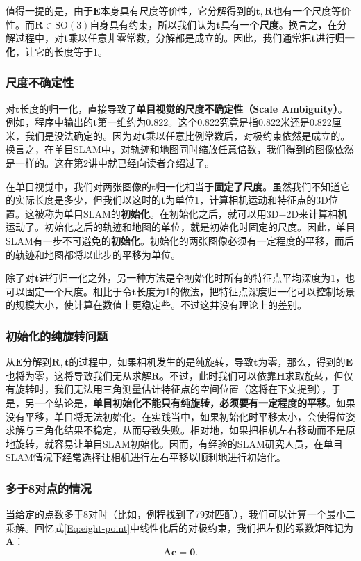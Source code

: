 值得一提的是，由于$\bm{E}$本身具有尺度等价性，它分解得到的$\bm{t}, \bm{R}$也有一个尺度等价性。而$\bm{R} \in \mathrm{SO}(3)$自身具有约束，所以我们认为$\bm{t}$具有一个\textbf{尺度}。换言之，在分解过程中，对$\bm{t}$乘以任意非零常数，分解都是成立的。因此，我们通常把$\bm{t}$进行\textbf{归一化}，让它的长度等于1。

\clearpage
\subsubsection{尺度不确定性}
对$\bm{t}$长度的归一化，直接导致了\textbf{单目视觉的尺度不确定性（Scale Ambiguity）}。例如，程序中输出的$\bm{t}$第一维约为0.822。这个0.822究竟是指0.822米还是0.822厘米，我们是没法确定的。因为对$\bm{t}$乘以任意比例常数后，对极约束依然是成立的。换言之，在单目SLAM中，对轨迹和地图同时缩放任意倍数，我们得到的图像依然是一样的。这在第2讲中就已经向读者介绍过了。

在单目视觉中，我们对两张图像的$\bm{t}$归一化相当于\textbf{固定了尺度}。虽然我们不知道它的实际长度是多少，但我们以这时的$\bm{t}$为单位1，计算相机运动和特征点的3D位置。这被称为单目SLAM的\textbf{初始化}。在初始化之后，就可以用3D−2D来计算相机运动了。初始化之后的轨迹和地图的单位，就是初始化时固定的尺度。因此，单目SLAM有一步不可避免的\textbf{初始化}。初始化的两张图像必须有一定程度的平移，而后的轨迹和地图都将以此步的平移为单位。

除了对$\bm{t}$进行归一化之外，另一种方法是令初始化时所有的特征点平均深度为1，也可以固定一个尺度。相比于令$\bm{t}$长度为1的做法，把特征点深度归一化可以控制场景的规模大小，使计算在数值上更稳定些。不过这并没有理论上的差别。

\subsubsection{初始化的纯旋转问题}
从$\bm{E}$分解到$\bm{R}, \bm{t}$的过程中，如果相机发生的是纯旋转，导致$\bm{t}$为零，那么，得到的$\bm{E}$也将为零，这将导致我们无从求解$\bm{R}$。不过，此时我们可以依靠$\bm{H}$求取旋转，但仅有旋转时，我们无法用三角测量估计特征点的空间位置（这将在下文提到），于是，另一个结论是，\textbf{单目初始化不能只有纯旋转，必须要有一定程度的平移}。如果没有平移，单目将无法初始化。在实践当中，如果初始化时平移太小，会使得位姿求解与三角化结果不稳定，从而导致失败。相对地，如果把相机左右移动而不是原地旋转，就容易让单目SLAM初始化。因而，有经验的SLAM研究人员，在单目SLAM情况下经常选择让相机进行左右平移以顺利地进行初始化。

\subsubsection{多于8对点的情况}
当给定的点数多于8对时（比如，例程找到了79对匹配），我们可以计算一个最小二乘解。回忆式\eqref{Eq:eight-point}中线性化后的对极约束，我们把左侧的系数矩阵记为$\bm{A}$：
\begin{equation}
\bm{A} \bm{e} = \bm{0} .
\end{equation}

